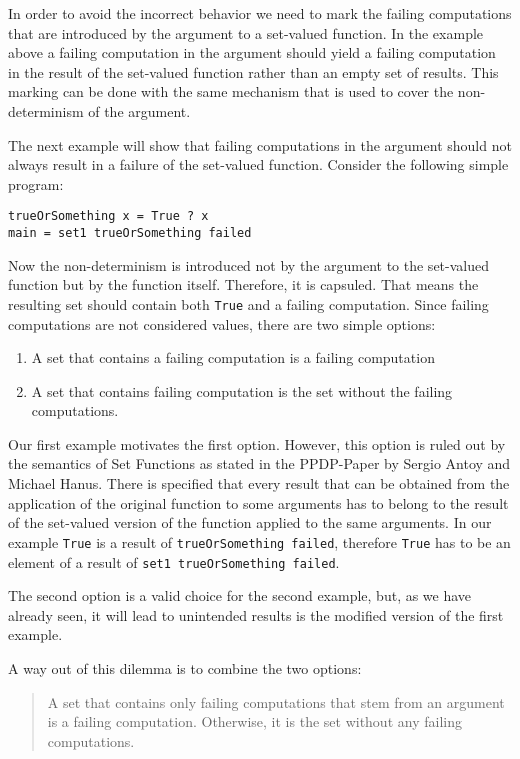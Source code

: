 \documentclass{article}
\begin{document}
In order to avoid the incorrect behavior we need to mark the failing computations
that are introduced by the argument to a set-valued function. In the example
above a failing computation in the argument should yield a failing computation
in the result of the set-valued function rather than an empty set of results.
This marking can be done with the same mechanism that is used to cover the
non-determinism of the argument.

The next example will show that failing computations in the argument should
not always result in a failure of the set-valued function. Consider the
following simple program:

\begin{lstlisting}
trueOrSomething x = True ? x
main = set1 trueOrSomething failed
\end{lstlisting}

Now the non-determinism is introduced not by the argument to the set-valued function
but by the function itself. Therefore, it is capsuled. That means the resulting set
should contain both \lstinline{True} and a failing computation. Since failing
computations are not considered values, there are two simple options:
\begin{enumerate}
\item A set that contains a failing computation is a failing computation
\item A set that contains failing computation is the set without the
      failing computations.
\end{enumerate}

Our first example motivates the first option. However, this option is ruled out
by the semantics of Set Functions as stated in the PPDP-Paper by Sergio Antoy
and Michael Hanus. There is specified that every result that can be obtained
from the application of the original function to some arguments has to belong
to the result of the set-valued version of the function applied to the same
arguments. In our example \lstinline{True} is a result of 
\lstinline{trueOrSomething failed}, therefore \lstinline{True} has to be an
element of a result of \lstinline{set1 trueOrSomething failed}.

The second option is a valid choice for the second example, but, as we have
already seen, it will lead to unintended results is the modified version
of the first example.

A way out of this dilemma is to combine the two options:

\begin{quote}
A set that contains only failing computations that stem from an argument
is a failing computation.
Otherwise, it is the set without any failing computations.
\end{quote}
\end{document}
